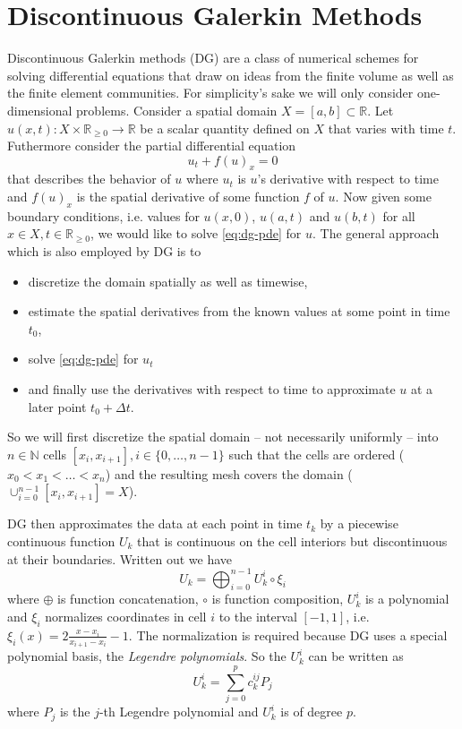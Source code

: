 \section{Discontinuous Galerkin Methods}
\label{sec:dg}

Discontinuous Galerkin methods (DG) are a class of numerical schemes for solving differential equations that draw on ideas from the finite volume as well as the finite element communities.
For simplicity's sake we will only consider one-dimensional problems.
Consider a spatial domain $X = [a, b] \subset \mathbb{R}$.
Let $u(x, t) : X \times \mathbb{R}_{\ge 0} \rightarrow \mathbb{R}$ be a scalar quantity defined on $X$ that varies with time $t$.
Futhermore consider the partial differential equation
\begin{equation}
  \label{eq:dg-pde}
  u_{t} + f(u)_{x} = 0
\end{equation}
that describes the behavior of $u$ where $u_{t}$ is $u$'s derivative with respect to time and $f(u)_{x}$ is the spatial derivative of some function $f$ of $u$.
Now given some boundary conditions, i.e. values for $u(x, 0)$, $u(a, t)$ and $u(b, t)$ for all $x \in X, t \in \mathbb{R}_{\ge 0}$, we would like to solve \eqref{eq:dg-pde} for $u$.
The general approach which is also employed by DG is to
\begin{itemize}
\item discretize the domain spatially as well as timewise,
\item estimate the spatial derivatives from the known values at some point in time $t_{0}$,
\item solve \eqref{eq:dg-pde} for $u_{t}$
\item and finally use the derivatives with respect to time to approximate $u$ at a later point $t_{0} + \Delta t$.
\end{itemize}
So we will first discretize the spatial domain -- not necessarily uniformly -- into $n \in \mathbb{N}$ cells $[x_{i}, x_{i + 1}], i \in \{ 0, \dots, n - 1 \}$ such that the cells are ordered ($x_{0} < x_{1} < \dots < x_{n}$) and the resulting mesh covers the domain ($\cup_{i = 0}^{n - 1} [x_{i}, x_{i + 1}] = X$).

DG then approximates the data at each point in time $t_{k}$ by a piecewise continuous function $U_{k}$ that is continuous on the cell interiors but discontinuous at their boundaries.
Written out we have
\begin{equation*}
  U_{k} = \bigoplus_{i = 0}^{n - 1} U_{k}^{i} \circ \xi_{i}
\end{equation*}
where $\oplus$ is function concatenation, $\circ$ is function composition, $U_{k}^{i}$ is a polynomial and $\xi_{i}$ normalizes coordinates in cell $i$ to the interval $[-1, 1]$, i.e. $\xi_{i}(x) = 2 \frac{x - x_{i}}{x_{i + 1} - x_{i}} - 1$.
The normalization is required because DG uses a special polynomial basis, the \emph{Legendre polynomials}.
So the $U_{k}^{i}$ can be written as
\begin{equation*}
  U_{k}^{i} = \sum_{j = 0}^{p} c_{k}^{ij} P_{j}
\end{equation*}
where $P_{j}$ is the $j$-th Legendre polynomial and $U_{k}^{i}$ is of degree $p$.


